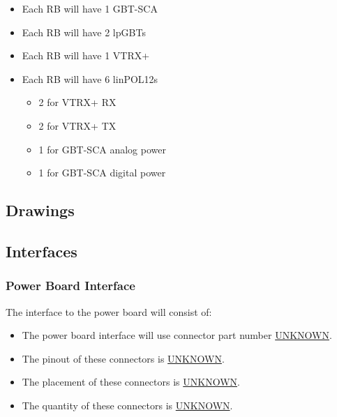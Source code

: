 \documentclass[11pt]{article}
\begin{document}
\begin{itemize}
\item Each RB will have 1 GBT-SCA
\item Each RB will have 2 lpGBTs
\item Each RB will have 1 VTRX+
\item Each RB will have 6 linPOL12s
\begin{itemize}
\item 2 for VTRX+ RX
\item 2 for VTRX+ TX
\item 1 for GBT-SCA analog power
\item 1 for GBT-SCA digital power
\end{itemize}
\end{itemize}
\subsection{Drawings}
\label{sec:org892480f}
\subsection{Interfaces}
\label{sec:org63b194c}
\subsubsection{Power Board Interface}
\label{sec:orgc988c1b}
The interface to the power board will consist of:
\begin{itemize}
\item The power board interface will use connector part number \uline{UNKNOWN}.
\item The pinout of these connectors is \uline{UNKNOWN}.
\item The placement of these connectors is \uline{UNKNOWN}.
\item The quantity of these connectors is \uline{UNKNOWN}.
\end{itemize}
\end{document}
